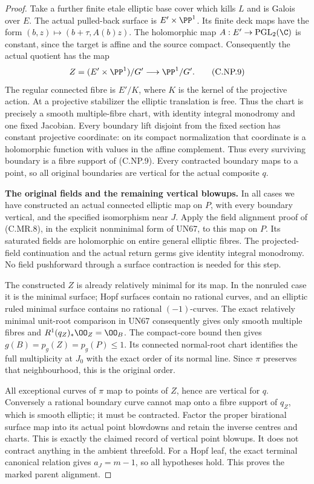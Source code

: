 \begin{proof}
Take a further finite
etale elliptic base cover
which kills \(L\) and
is Galois over \(E\).
The actual pulled-back
surface is \(E'\times\PP^1\).
Its finite deck maps have
the form
\((b,z)\mapsto(b+\tau,A(b)z)\).
The holomorphic map
\(A:E'\to\operatorname{PGL}_2(\C)\)
is constant, since the
target is affine and
the source compact.
Consequently the
actual quotient has
the map
\[
        Z=(E'\times\PP^1)/G'
                   \longrightarrow\PP^1/G'.
 \tag{C.NP.9}
\]
The regular connected
fibre is \(E'/K\), where
\(K\) is the kernel of
the projective action.
At a projective stabilizer
the elliptic translation
is free. Thus the chart
is precisely a smooth
multiple-fibre chart,
with identity integral
monodromy and one fixed
Jacobian. Every boundary
lift disjoint from the
fixed section has constant
projective coordinate:
on its compact
normalization that
coordinate is a
holomorphic function
with values in the
affine complement.
Thus every surviving
boundary is a fibre
support of (C.NP.9).
Every contracted boundary
maps to a point, so
all original boundaries
are vertical for the
actual composite \(q\).

\par\medskip\noindent\textbf{The original fields and the remaining vertical blowups.}
In all cases we have
constructed an actual
connected elliptic map
on \(P\), with every
boundary vertical, and
the specified isomorphism
near \(J\). Apply the
field alignment proof
of (C.MR.8), in the
explicit nonminimal
form of UN67, to this
map on \(P\). Its
saturated fields are
holomorphic on entire
general elliptic fibres.
The projected-field
continuation and the
actual return germs
give identity integral
monodromy. No field
pushforward through a
surface contraction is
needed for this step.

The constructed \(Z\)
is already relatively
minimal for its map.
In the nonruled case
it is the minimal
surface; Hopf surfaces
contain no rational
curves, and an elliptic
ruled minimal surface
contains no rational
\((-1)\)-curves. The
exact relatively minimal
unit-root comparison in
UN67 consequently gives
only smooth multiple
fibres and
\(R^1(q_Z)_*\OO_Z=\OO_B\).
The compact-core bound
then gives
\(g(B)=p_g(Z)=p_g(P)\le1\).
Its connected normal-root
chart identifies the full
multiplicity at \(J_0\)
with the exact order of
its normal line. Since
\(\pi\) preserves that
neighbourhood, this is
the original order.

All exceptional curves
of \(\pi\) map to
points of \(Z\), hence
are vertical for \(q\).
Conversely a rational
boundary curve cannot
map onto a fibre support
of \(q_Z\), which is
smooth elliptic; it
must be contracted.
Factor the proper
birational surface map
into its actual point
blowdowns and retain
the inverse centres
and charts. This is
exactly the claimed
record of vertical
point blowups. It
does not contract
anything in the
ambient threefold.
For a Hopf leaf,
the exact terminal
canonical relation
gives \(a_J=m-1\),
so all hypotheses
hold. This proves
the marked parent
alignment.
\end{proof}
